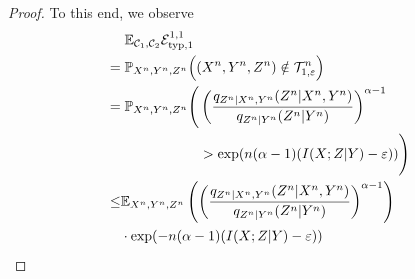 \documentclass[journal]{IEEEtran}
\newcommand{\channelpmf}{q}
\newcommand{\channelInOne}{X}
\newcommand{\channelInTwo}{Y}
\newcommand{\channelOut}{Z}
\newcommand{\codebookOne}{\mathcal{C}_1}
\newcommand{\codebookTwo}{\mathcal{C}_2}
\newcommand{\codebookBlocklength}{n}
\newcommand{\mutualInformationConditional}[3]{I(#1;#2|#3)}
\newcommand{\renyiParam}{\alpha}
\newcommand{\Expectation}{\mathbb{E}}
\newcommand{\Probability}{\mathbb{P}}
\newcommand{\typicalityParam}{\varepsilon}
\newcommand{\typicalSetIndex}[3]{\mathcal{T}_{#3,#1}^{#2}}
\newcommand{\errorprob}{\mathcal{E}}
\begin{document}
\begin{proof}
To this end, we observe
\begin{align}
&\begin{aligned}
\hphantom{={}}
\Expectation_{\codebookOne, \codebookTwo} \errorprob_{\mathrm{typ},1}^{1,1}
\end{aligned}
\\
&\begin{aligned}
=
\Probability_{\channelInOne^\codebookBlocklength, \channelInTwo^\codebookBlocklength, \channelOut^\codebookBlocklength} \Big(
  (\channelInOne^\codebookBlocklength, \channelInTwo^\codebookBlocklength, \channelOut^\codebookBlocklength)
  \notin
  \typicalSetIndex{\typicalityParam}{\codebookBlocklength}{1}
\Big)
\end{aligned}
\\
\label{proof:mac-coding-typical-error-chernoffprep}
&\begin{aligned}
=
\Probability_{\channelInOne^\codebookBlocklength, \channelInTwo^\codebookBlocklength, \channelOut^\codebookBlocklength} \Bigg(
  &\left(
    \frac{\channelpmf_{\channelOut^\codebookBlocklength | \channelInOne^\codebookBlocklength, \channelInTwo^\codebookBlocklength}
          (\channelOut^\codebookBlocklength | \channelInOne^\codebookBlocklength, \channelInTwo^\codebookBlocklength)}
         {\channelpmf_{\channelOut^\codebookBlocklength | \channelInTwo^\codebookBlocklength}
          (\channelOut^\codebookBlocklength | \channelInTwo^\codebookBlocklength)}
  \right)^{\renyiParam-1}
  \\
  &>
  \exp(\codebookBlocklength(\renyiParam-1)(\mutualInformationConditional{\channelInOne}{\channelOut}{\channelInTwo}-\typicalityParam))
\Bigg)
\end{aligned}
\\
\label{proof:mac-coding-typical-error-markov}
&\begin{aligned}
\leq
&\Expectation_{\channelInOne^\codebookBlocklength, \channelInTwo^\codebookBlocklength, \channelOut^\codebookBlocklength} \left(
  \left(
    \frac{\channelpmf_{\channelOut^\codebookBlocklength | \channelInOne^\codebookBlocklength, \channelInTwo^\codebookBlocklength}
          (\channelOut^\codebookBlocklength | \channelInOne^\codebookBlocklength, \channelInTwo^\codebookBlocklength)}
         {\channelpmf_{\channelOut^\codebookBlocklength | \channelInTwo^\codebookBlocklength}
          (\channelOut^\codebookBlocklength | \channelInTwo^\codebookBlocklength)}
  \right)^{\renyiParam-1}
\right)
\\
&\cdot \exp(-\codebookBlocklength(\renyiParam-1)(\mutualInformationConditional{\channelInOne}{\channelOut}{\channelInTwo}-\typicalityParam))

\end{aligned}
\end{align}
\end{proof}
\end{document}
